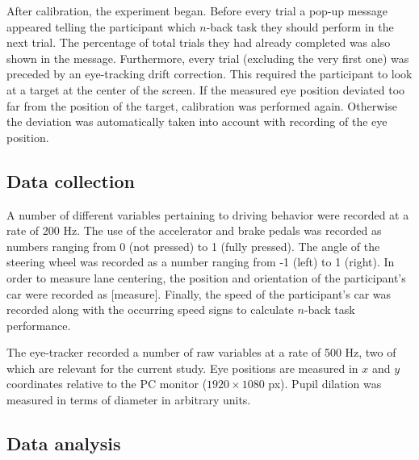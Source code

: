 After calibration, the experiment began. 
Before every trial a pop-up message appeared telling the participant which \(n\)-back task they should perform in the next trial. 
The percentage of total trials they had already completed was also shown in the message. 
Furthermore, every trial (excluding the very first one) was preceded by an eye-tracking drift correction. 
This required the participant to look at a target at the center of the screen. 
If the measured eye position deviated too far from the position of the target, calibration was performed again. 
Otherwise the deviation was automatically taken into account with recording of the eye position. 

\subsection{Data collection}
A number of different variables pertaining to driving behavior were recorded at a rate of 200 Hz. 
The use of the accelerator and brake pedals was recorded as numbers ranging from 0 (not pressed) to 1 (fully pressed). 
The angle of the steering wheel was recorded as a number ranging from -1 (left) to 1 (right).
In order to measure lane centering, the position and orientation of the participant's car were recorded as [measure]. 
Finally, the speed of the participant's car was recorded along with the occurring speed signs to calculate \(n\)-back task performance. 

The eye-tracker recorded a number of raw variables at a rate of 500 Hz, two of which are relevant for the current study.
Eye positions are measured in \(x\) and \(y\) coordinates relative to the PC monitor (\(1920 \times 1080\) px).
Pupil dilation was measured in terms of diameter in arbitrary units. 

\subsection{Data analysis}
